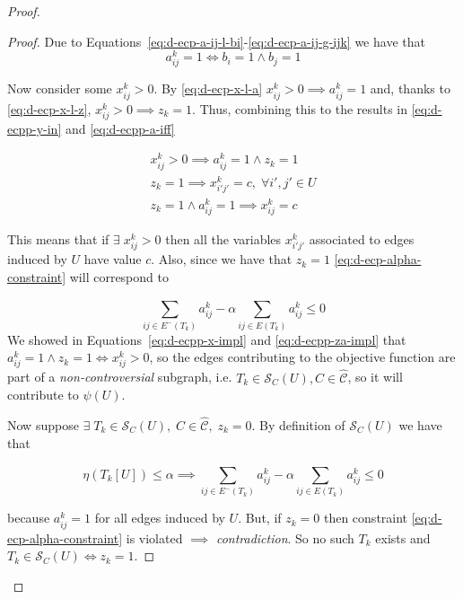 \begin{proof}
\begin{proof}
		Due to Equations~\ref{eq:d-ecp-a-ij-l-bi}-\ref{eq:d-ecp-a-ij-g-ijk} we
		have that
		\begin{equation}
			\label{eq:d-ecpp-a-iff}
			a_{ij}^{k} = 1 \iff b_i = 1 \land b_j = 1
		\end{equation}

		Now consider some $x_{ij}^{k} > 0 $. By \autoref{eq:d-ecp-x-l-a}
		$x_{ij}^{k} > 0 \implies a _{ij}^{k} = 1$ and, thanks to
		\autoref{eq:d-ecp-x-l-z}, $x_{ij}^{k} > 0 \implies z_k = 1$. Thus, combining
		this to the results in \autoref{eq:d-ecpp-y-in} and
		\autoref{eq:d-ecpp-a-iff}

		\begin{gather}
			\label{eq:d-ecpp-x-impl}
			x_{ij}^{k} > 0 \implies a_{ij}^{k} = 1 \land z_k =1 \\
			\label{eq:d-ecpp-z-impl}
			z_k = 1 \implies x_{i'j'}^{k} = c, \; \forall i', j' \in U \\
			\label{eq:d-ecpp-za-impl}
			z_k = 1 \land a_{ij}^{k} = 1 \implies x_{ij}^{k} = c
		\end{gather}

		This means that if $\exists \; x_{ij}^{k} > 0$ then all the variables
		$x_{i'j'}^{k}$ associated to edges induced by $U$ have value $c$.
		Also, since we have that $z_k = 1$ \autoref{eq:d-ecp-alpha-constraint}
		will correspond to

		\begin{equation}
			\sum^{}_{ij \in E^{-} (T_k)} a_{ij}^{k}  - \alpha \sum^{}_{ij \in E(T_k)}
			a_{ij} ^{k} \leq 0
		\end{equation}
		We showed in Equations~\ref{eq:d-ecpp-x-impl} and \autoref{eq:d-ecpp-za-impl} that $a_{ij}^{k} = 1 \land z_k
			= 1 \iff x_{ij}^{k} > 0 $, so the edges contributing to the objective
		function are part of a \emph{non-controversial} subgraph, i.e. $T_k \in
			\mathcal{S}_C(U), C \in \mathcal{\hat{C}}$, so it will contribute to $\psi(U)$.

		Now suppose $\exists \; T_k \in \mathcal{S}_C(U), \; C \in \mathcal{\hat{C}},
			\; z_k = 0$. By definition of $\mathcal{S}_C(U)$ we have that

		\begin{equation}
			\eta(T_k[U]) \leq \alpha  \implies \sum^{}_{ij \in E^{-} (T_k)} a_{ij}^{k}  - \alpha \sum^{}_{ij \in E(T_k)}
			a_{ij} ^{k} \leq 0
		\end{equation}

		because $a_{ij}^{k} = 1$ for all edges induced by $U$. But, if $z_k =
			0$ then constraint \ref{eq:d-ecp-alpha-constraint} is violated
		$\implies $ \emph{contradiction}. So no such $T_k$ exists and $T_k
			\in \mathcal{S}_C(U) \iff z_k = 1$.


\end{proof}
\end{proof}
